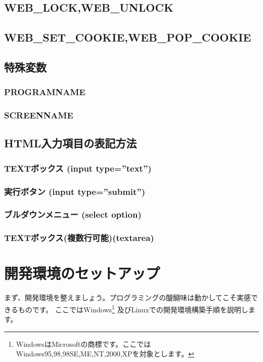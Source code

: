 \subsection{WEB\_LOCK,WEB\_UNLOCK}

\subsection{WEB\_SET\_COOKIE,WEB\_POP\_COOKIE}

\subsection{特殊変数}

\subsubsection{PROGRAMNAME}

\subsubsection{SCREENNAME}

\subsection{HTML入力項目の表記方法}
\subsubsection{TEXTボックス (input type=''text'')}

\subsubsection{実行ボタン (input type=''submit'')}

\subsubsection{ブルダウンメニュー (select option)}

\subsubsection{TEXTボックス(複数行可能)(textarea)}

\newpage
\section{開発環境のセットアップ}

まず、開発環境を整えましょう。プログラミングの醍醐味は動かしてこそ実感できるものです。
ここではWindows\footnote{WindowsはMicrosoftの商標です。ここではWindows95,98,98SE,ME,NT,2000,XPを対象とします。}
及びLinuxでの開発環境構築手順を説明します。

